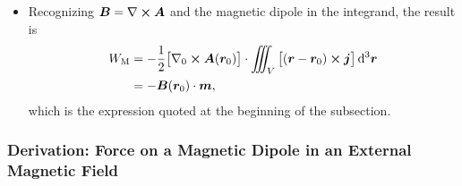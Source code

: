 \documentclass[11pt, a4paper]{article}
\newcommand{\diff}{\mathop{}\!\mathrm{d}} %
\newcommand{\dr}{\diff^{3} \r}  %
\renewcommand{\vec}[1]{\bm{#1}} %
\renewcommand{\r}{\vec{r}}
\newcommand{\B}{\vec{B}} %
\newcommand{\A}{\vec{A}} %
\newcommand{\m}{\vec{m}}  %
\renewcommand{\j}{\vec{j}}  %
\renewcommand{\curl}{\nabla \cross}
\renewcommand{\grad}{\nabla}
\begin{document}
\begin{itemize}
	\item Recognizing $ \B = \curl \A $ and the magnetic dipole in the integrand, the result is
	\begin{align*}
		W_{\text{M}} &=  -\frac{1}{2} \big[\grad_{0}\cross \A(\r_{0})\big] \cdot \iiint_{V}\big[(\r - \r_{0}) \cross \j\big] \dr\\
		&= - \B(\r_{0})  \cdot \m,
	\end{align*}
	which is the expression quoted at the beginning of the subsection.
	
\end{itemize}

\subsubsection{Derivation: Force on a Magnetic Dipole in an External Magnetic Field}
\end{document}
